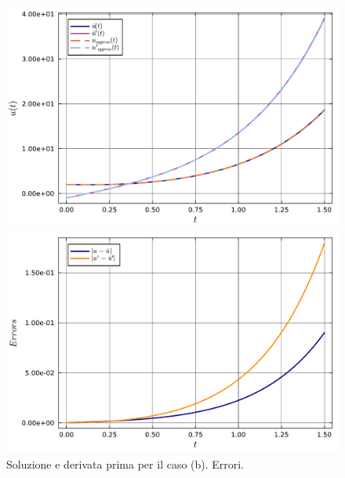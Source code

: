 \documentclass[letterpaper, 12pt]{article}
\numberwithin{equation}{section}    %
\begin{document}
\begin{figure}[!ht]
    \centering
    \begin{minipage}[b]{0.47\textwidth}
        \includegraphics[width=\textwidth]{6233.pdf}
    \end{minipage}
    \hspace{0.5cm}
    \begin{minipage}[b]{0.47\textwidth}
        \includegraphics[width=\textwidth]{6234.pdf}
    \end{minipage}
    \caption{Soluzione e derivata prima per il caso (b). Errori.}
    \label{fig:es6_2_3_2}
\end{figure}
\end{document}

